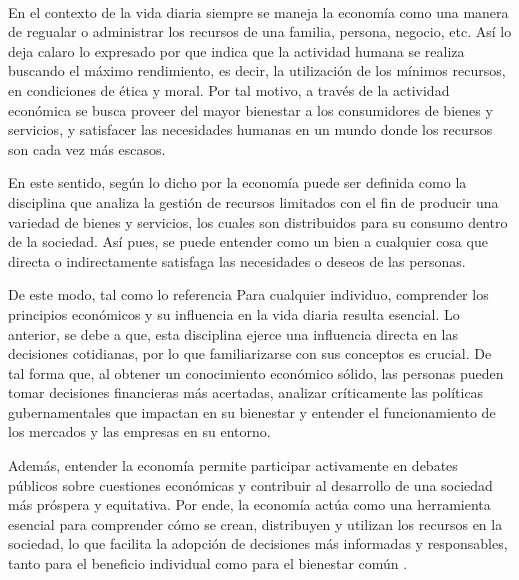 
\justify
\fontsize{12pt}{14}\
\setlength{\parindent}{0cm}

\normalsize En el contexto de la vida diaria siempre se maneja la economía como una manera de regualar o administrar los recursos de una familia, persona, negocio, etc. Así lo deja calaro lo expresado por \cite{pereira2011} que indica que la actividad humana se realiza buscando el máximo rendimiento, es decir, la utilización de los mínimos recursos, en condiciones de ética y moral. Por tal motivo, a través de la actividad económica se busca proveer del mayor bienestar a los consumidores de bienes y servicios, y satisfacer las necesidades humanas en un mundo donde los recursos son cada vez más escasos.

\normalsize En este sentido, según lo dicho por \cite{llorca2016} la economía puede ser definida como la disciplina que analiza la gestión de recursos limitados con el fin de producir una variedad de bienes y servicios, los cuales son distribuidos para su consumo dentro de la sociedad. Así pues, se puede entender como un bien a cualquier cosa que directa o indirectamente satisfaga las necesidades o deseos de las personas.

\normalsize De este modo, tal como lo referencia \cite{euroinnova2023} Para cualquier individuo, comprender los principios económicos y su influencia en la vida diaria resulta esencial. Lo anterior, se debe a que, esta disciplina ejerce una influencia directa en las decisiones cotidianas, por lo que familiarizarse con sus conceptos es crucial. De tal forma que, al obtener un conocimiento económico sólido, las personas pueden tomar decisiones financieras más acertadas, analizar críticamente las políticas gubernamentales que impactan en su bienestar y entender el funcionamiento de los mercados y las empresas en su entorno.

\normalsize Además, entender la economía permite participar activamente en debates públicos sobre cuestiones económicas y contribuir al desarrollo de una sociedad más próspera y equitativa. Por ende, la economía actúa como una herramienta esencial para comprender cómo se crean, distribuyen y utilizan los recursos en la sociedad, lo que facilita la adopción de decisiones más informadas y responsables, tanto para el beneficio individual como para el bienestar común \parencite{euroinnova2023}.
